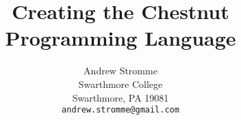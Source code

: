 \documentclass[11pt]{article}
\begin{document}
\title{Creating the Chestnut Programming Language}


\author{
  Andrew Stromme \\                 
  Swarthmore College \\
  Swarthmore, PA 19081 \\
  {\tt andrew.stromme@gmail.com}}

\date{}
\maketitle














\end{document}
